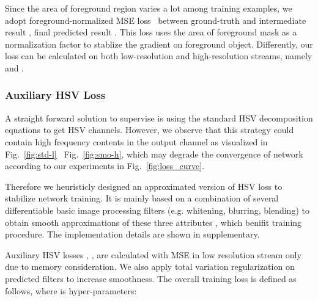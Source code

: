 \documentclass[runningheads]{llncs}
\begin{document}
    Since the area of foreground region varies a lot among training examples, we adopt foreground-normalized MSE loss~\cite{sofiiuk2021foreground} between ground-truth  and intermediate result , final predicted result .
    This loss uses the area of foreground mask as a normalization factor to stablize the gradient on foreground object.
    Differently, our loss can be calculated on both low-resolution and high-resolution streams, namely  and . 






    \subsubsection{Auxiliary HSV Loss} \label{section:smooth}
    


    


    A straight forward solution to supervise  is using the standard HSV decomposition equations to get HSV channels. However, we observe that this strategy could contain high frequency contents in the output channel as visualized in Fig.~\ref{fig:std-l}~ Fig.~\ref{fig:smo-h}, which may degrade the convergence of network according to our experiments in Fig.~\ref{fig:loss_curve}.
    
    Therefore we heuristicly designed an approximated version of HSV loss to stabilize network training. 
    It is mainly based on a combination of several differentiable basic image processing filters (e.g. whitening, blurring, blending) to obtain smooth approximations of these three attributes , which benifit training procedure.
    The implementation details are shown in supplementary.


    
    Auxiliary HSV losses , ,  are calculated with MSE in low resolution stream only due to memory consideration. 
    We also apply total variation regularization on predicted filters to increase smoothness.
    The overall training loss is defined as follows, where  is hyper-parameters:






    
    
\end{document}
